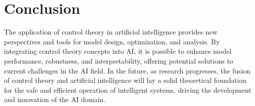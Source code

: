 \documentclass{article}
\theoremstyle{plain}
\theoremstyle{definition}
\theoremstyle{remark}
\begin{document}
\section{Conclusion}
The application of control theory in artificial intelligence provides new perspectives and tools for model design, optimization, and analysis. By integrating control theory concepts into AI, it is possible to enhance model performance, robustness, and interpretability, offering potential solutions to current challenges in the AI field. In the future, as research progresses, the fusion of control theory and artificial intelligence will lay a solid theoretical foundation for the safe and efficient operation of intelligent systems, driving the development and innovation of the AI domain.
\end{document}
